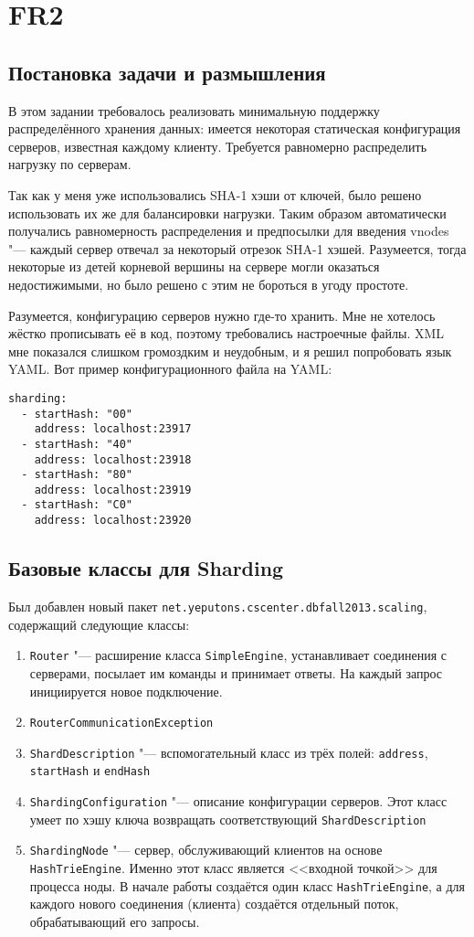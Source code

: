 \documentclass[a4paper]{article}
\renewcommand{\t}{\texttt}
\begin{document}
\section{FR2}
\subsection{Постановка задачи и размышления}
  В этом задании требовалось реализовать минимальную поддержку распределённого хранения данных:
  имеется некоторая статическая конфигурация серверов, известная каждому клиенту. Требуется равномерно
  распределить нагрузку по серверам.

  Так как у меня уже использовались SHA-1 хэши от ключей, было решено использовать их же для балансировки
  нагрузки. Таким образом автоматически получались равномерность распределения и предпосылки для введения
  vnodes "--- каждый сервер отвечал за некоторый отрезок SHA-1 хэшей. Разумеется, тогда некоторые
  из детей корневой вершины на сервере могли оказаться недостижимыми, но было решено с этим не бороться в
  угоду простоте.

  Разумеется, конфигурацию серверов нужно где-то хранить. Мне не хотелось жёстко прописывать её в код, поэтому
  требовались настроечные файлы. XML мне показался слишком громоздким и неудобным, и я решил
  попробовать язык YAML. Вот пример конфигурационного файла на YAML:

\begin{verbatim}
sharding:
  - startHash: "00"
    address: localhost:23917
  - startHash: "40"
    address: localhost:23918
  - startHash: "80"
    address: localhost:23919
  - startHash: "C0"
    address: localhost:23920
\end{verbatim}

\subsection{Базовые классы для Sharding}
  Был добавлен новый пакет \t{net.yeputons.cscenter.dbfall2013.scaling}, содержащий следующие классы:

  \begin{enumerate}
  \item \t{Router} "--- расширение класса \t{SimpleEngine}, устанавливает соединения с серверами,
        посылает им команды и принимает ответы. На каждый запрос инициируется новое подключение.
  \item \t{RouterCommunicationException}
  \item \t{ShardDescription} "--- вспомогательный класс из трёх полей: \t{address}, \t{startHash} и \t{endHash}
  \item \t{ShardingConfiguration} "--- описание конфигурации серверов. Этот класс умеет по хэшу ключа
        возвращать соответствующий \t{ShardDescription}
  \item \t{ShardingNode} "--- сервер, обслуживающий клиентов на основе \t{HashTrieEngine}. Именно этот
        класс является <<входной точкой>> для процесса ноды. В начале работы создаётся один класс \t{HashTrieEngine},
        а для каждого нового соединения (клиента) создаётся отдельный поток, обрабатывающий его запросы.
  \end{enumerate}
\end{document}
